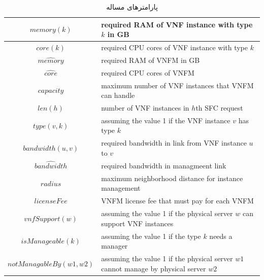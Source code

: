 \begin{table}[h!]
    \vspace{0.5cm}
    \caption{پارامتر‌های مساله}
    \begin{center}\begin{latin}\begin{tabular}{|c|p{10cm}|}
    \hline
    \(memory(k)\) & required RAM of VNF instance with type \(k\) in GB \\
    \hline
    \(core(k)\) & required CPU cores of VNF instance with type \(k\) \\
    \hline
    \(\hat{memory}\) & required RAM of VNFM in GB \\
    \hline
    \(\hat{core}\) & required CPU cores of VNFM \\
    \hline
    \(capacity\) & maximum number of VNF instances that VNFM can handle \\
    \hline
    \(len(h)\) & number of VNF instances in \(h\)th SFC request \\
    \hline
    \(type(v, k)\) & assuming the value 1 if the VNF instance \(v\) has type \(k\)  \\
    \hline
    \(bandwidth(u, v)\) & required bandwidth in link from VNF instance \(u\) to \(v\) \\
    \hline
    \(\hat{bandwidth}\) & required bandwidth in managmeent link \\
    \hline
    \(radius\) & maximum neighborhood distance for instance management \\
    \hline
    \(licenseFee\) & VNFM license fee that must pay for each VNFM \\
    \hline
    \(vnfSupport(w)\) & assuming the value 1 if the physical server \(w\) can support VNF instances \\
    \hline
    \(isManageable(k)\) & assuming the value 1 if the type \(k\) needs a manager \\
    \hline
    \(notManagableBy(w1, w2)\) & assuming the value 1 if the physical server \(w1\) cannot manage by physical server \(w2\) \\
    \hline
    \end{tabular}\end{latin}\end{center}
\end{table}


